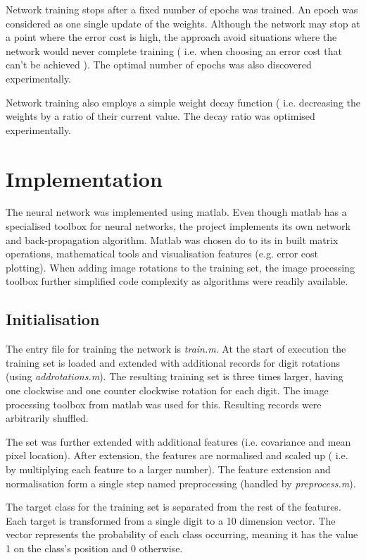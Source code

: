 \documentclass[11]{article}
\begin{document}
Network training stops after a fixed number of epochs was trained. An epoch was considered as one single update of the weights. Although the network may stop at a point where the error cost is high, the approach avoid situations where the network would never complete training ( i.e. when choosing an error cost that can't be achieved ). The optimal number of epochs was also discovered experimentally. 

Network training also employs a simple weight decay function ( i.e. decreasing the weights by a ratio of their current value. The decay ratio was optimised experimentally. 

\section{Implementation}

The neural network was implemented using matlab. Even though matlab has a specialised toolbox for neural networks, the project implements its own network and back-propagation algorithm. Matlab was chosen do to its in built matrix operations, mathematical tools and visualisation features (e.g. error cost plotting). When adding image rotations to the training set, the image processing toolbox further simplified code complexity as algorithms were readily available.

\subsection{Initialisation}

The entry file for training the network is \emph{train.m}. At the start of execution the training set is loaded and extended with additional records for digit rotations (using \emph{addrotations.m}). The resulting training set is three times larger, having one clockwise and one counter clockwise rotation for each digit. The image processing toolbox from matlab was used for this. Resulting records were arbitrarily shuffled.

The set was further extended with additional features (i.e. covariance and mean pixel location). After extension, the features are normalised and scaled up ( i.e. by multiplying each feature to a larger number). The feature extension and normalisation form a single step named preprocessing (handled by \emph{preprocess.m}).

The target class for the training set is separated from the rest of the features. Each target is transformed from a single digit to a 10 dimension vector. The vector represents the probability of each class occurring, meaning it has the value 1 on the class's position and 0 otherwise. 
\end{document}
